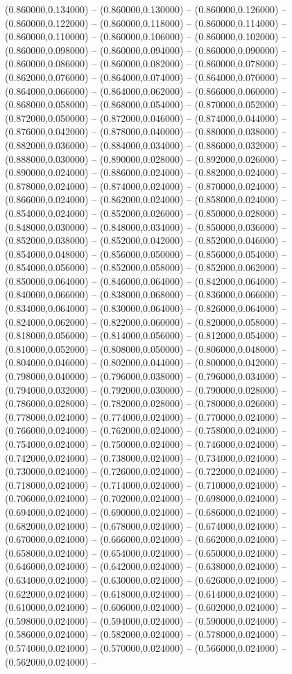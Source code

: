 (0.860000,0.134000) -- (0.860000,0.130000) -- (0.860000,0.126000) -- (0.860000,0.122000) -- (0.860000,0.118000) -- (0.860000,0.114000) -- (0.860000,0.110000) -- (0.860000,0.106000) -- (0.860000,0.102000) -- (0.860000,0.098000) -- (0.860000,0.094000) -- (0.860000,0.090000) -- (0.860000,0.086000) -- (0.860000,0.082000) -- (0.860000,0.078000) -- (0.862000,0.076000) -- (0.864000,0.074000) -- (0.864000,0.070000) -- (0.864000,0.066000) -- (0.864000,0.062000) -- (0.866000,0.060000) -- (0.868000,0.058000) -- (0.868000,0.054000) -- (0.870000,0.052000) -- (0.872000,0.050000) -- (0.872000,0.046000) -- (0.874000,0.044000) -- (0.876000,0.042000) -- (0.878000,0.040000) -- (0.880000,0.038000) -- (0.882000,0.036000) -- (0.884000,0.034000) -- (0.886000,0.032000) -- (0.888000,0.030000) -- (0.890000,0.028000) -- (0.892000,0.026000) -- (0.890000,0.024000) -- (0.886000,0.024000) -- (0.882000,0.024000) -- (0.878000,0.024000) -- (0.874000,0.024000) -- (0.870000,0.024000) -- (0.866000,0.024000) -- (0.862000,0.024000) -- (0.858000,0.024000) -- (0.854000,0.024000) -- (0.852000,0.026000) -- (0.850000,0.028000) -- (0.848000,0.030000) -- (0.848000,0.034000) -- (0.850000,0.036000) -- (0.852000,0.038000) -- (0.852000,0.042000) -- (0.852000,0.046000) -- (0.854000,0.048000) -- (0.856000,0.050000) -- (0.856000,0.054000) -- (0.854000,0.056000) -- (0.852000,0.058000) -- (0.852000,0.062000) -- (0.850000,0.064000) -- (0.846000,0.064000) -- (0.842000,0.064000) -- (0.840000,0.066000) -- (0.838000,0.068000) -- (0.836000,0.066000) -- (0.834000,0.064000) -- (0.830000,0.064000) -- (0.826000,0.064000) -- (0.824000,0.062000) -- (0.822000,0.060000) -- (0.820000,0.058000) -- (0.818000,0.056000) -- (0.814000,0.056000) -- (0.812000,0.054000) -- (0.810000,0.052000) -- (0.808000,0.050000) -- (0.806000,0.048000) -- (0.804000,0.046000) -- (0.802000,0.044000) -- (0.800000,0.042000) -- (0.798000,0.040000) -- (0.796000,0.038000) -- (0.796000,0.034000) -- (0.794000,0.032000) -- (0.792000,0.030000) -- (0.790000,0.028000) -- (0.786000,0.028000) -- (0.782000,0.028000) -- (0.780000,0.026000) -- (0.778000,0.024000) -- (0.774000,0.024000) -- (0.770000,0.024000) -- (0.766000,0.024000) -- (0.762000,0.024000) -- (0.758000,0.024000) -- (0.754000,0.024000) -- (0.750000,0.024000) -- (0.746000,0.024000) -- (0.742000,0.024000) -- (0.738000,0.024000) -- (0.734000,0.024000) -- (0.730000,0.024000) -- (0.726000,0.024000) -- (0.722000,0.024000) -- (0.718000,0.024000) -- (0.714000,0.024000) -- (0.710000,0.024000) -- (0.706000,0.024000) -- (0.702000,0.024000) -- (0.698000,0.024000) -- (0.694000,0.024000) -- (0.690000,0.024000) -- (0.686000,0.024000) -- (0.682000,0.024000) -- (0.678000,0.024000) -- (0.674000,0.024000) -- (0.670000,0.024000) -- (0.666000,0.024000) -- (0.662000,0.024000) -- (0.658000,0.024000) -- (0.654000,0.024000) -- (0.650000,0.024000) -- (0.646000,0.024000) -- (0.642000,0.024000) -- (0.638000,0.024000) -- (0.634000,0.024000) -- (0.630000,0.024000) -- (0.626000,0.024000) -- (0.622000,0.024000) -- (0.618000,0.024000) -- (0.614000,0.024000) -- (0.610000,0.024000) -- (0.606000,0.024000) -- (0.602000,0.024000) -- (0.598000,0.024000) -- (0.594000,0.024000) -- (0.590000,0.024000) -- (0.586000,0.024000) -- (0.582000,0.024000) -- (0.578000,0.024000) -- (0.574000,0.024000) -- (0.570000,0.024000) -- (0.566000,0.024000) -- (0.562000,0.024000) -- 